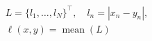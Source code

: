 
\begin{gather}
	L = \{l_1,\dots,l_N\}^\top, \quad
	l_n = \left| x_n - y_n \right|,\\
	\ell(x,y) = \operatorname{mean}(L) \label{eq:l1loss}
\end{gather}



